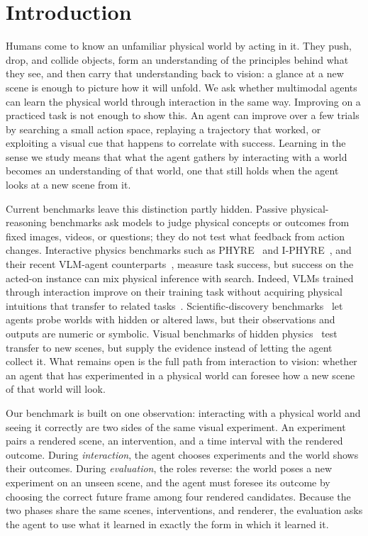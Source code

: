 \section{Introduction}
\label{sec:intro}

Humans come to know an unfamiliar physical world by acting in it. They push, drop, and collide objects, form an understanding of the principles behind what they see, and then carry that understanding back to vision: a glance at a new scene is enough to picture how it will unfold. We ask whether multimodal agents can learn the physical world through interaction in the same way. Improving on a practiced task is not enough to show this. An agent can improve over a few trials by searching a small action space, replaying a trajectory that worked, or exploiting a visual cue that happens to correlate with success. Learning in the sense we study means that what the agent gathers by interacting with a world becomes an understanding of that world, one that still holds when the agent looks at a new scene from it.

Current benchmarks leave this distinction partly hidden. Passive physical-reasoning benchmarks ask models to judge physical concepts or outcomes from fixed images, videos, or questions; they do not test what feedback from action changes. Interactive physics benchmarks such as PHYRE~\cite{phyre} and I-PHYRE~\cite{iphyre}, and their recent VLM-agent counterparts~\cite{deepphy,ipr1}, measure task success, but success on the acted-on instance can mix physical inference with search. Indeed, VLMs trained through interaction improve on their training task without acquiring physical intuitions that transfer to related tasks~\cite{schulzebuschoff2026}. Scientific-discovery benchmarks~\cite{physgym,newtonbench,discoverphysics} let agents probe worlds with hidden or altered laws, but their observations and outputs are numeric or symbolic. Visual benchmarks of hidden physics~\cite{comphy,inphyre} test transfer to new scenes, but supply the evidence instead of letting the agent collect it. What remains open is the full path from interaction to vision: whether an agent that has experimented in a physical world can foresee how a new scene of that world will look.

Our benchmark is built on one observation: interacting with a physical world and seeing it correctly are two sides of the same visual experiment. An experiment pairs a rendered scene, an intervention, and a time interval with the rendered outcome. During \emph{interaction}, the agent chooses experiments and the world shows their outcomes. During \emph{evaluation}, the roles reverse: the world poses a new experiment on an unseen scene, and the agent must foresee its outcome by choosing the correct future frame among four rendered candidates. Because the two phases share the same scenes, interventions, and renderer, the evaluation asks the agent to use what it learned in exactly the form in which it learned it.

